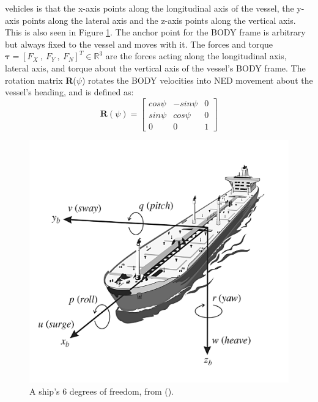 vehicles is that the x-axis points along the longitudinal axis of the vessel, the y-axis points along the lateral axis
and the z-axis points along the vertical axis. This is also seen in Figure \ref{FIG: Ship DOF}.
The anchor point for the BODY frame is arbitrary but always fixed to the vessel and moves with it. 
The forces and torque $\bm{\tau} = [F_{X}\ , \ F_{Y} \ , \ F_{N}]^T \in \mathbb{R}^{3}$ are the forces acting along
the longitudinal axis, lateral axis, and torque about the vertical axis of the vessel's BODY frame. The rotation matrix \textbf{R}($\psi$) rotates the BODY velocities into \gls{NED} movement about the
vessel's heading, and is defined as:
\begin{equation}
    \textbf{R}(\psi) = \begin{bmatrix}
                        cos\psi &   -sin\psi & 0\\
                        sin\psi & cos\psi    & 0\\
                        0       &   0        & 1
                        \end{bmatrix}
\end{equation}


\begin{figure}[ht]
    \centering
    \includegraphics[height=0.35\textheight]{Images/SHIPDOF_FOSSEN.png}
    \caption{A ship's 6 degrees of freedom, from (\cite{fossen2011handbook}).} %
    \label{FIG: Ship DOF}
\end{figure}


